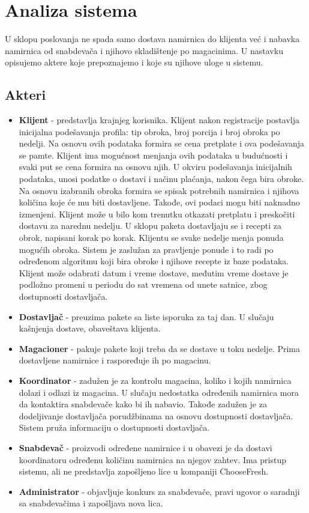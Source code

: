 \section{Analiza sistema}

	U sklopu poslovanja ne spada samo dostava namirnica do klijenta već i nabavka namirnica od snabdevača i njihovo skladištenje po magacinima. U nastavku opisujemo aktere koje prepoznajemo i koje su njihove uloge u sistemu.

\subsection{Akteri}
	\begin{itemize}
		\item{\textbf{Klijent}} - predstavlja krajnjeg korisnika. Klijent nakon registracije postavlja inicijalna podešavanja profila: tip obroka, broj porcija i broj obroka po nedelji. Na osnovu ovih podataka formira se cena pretplate i ova podešavanja se pamte. Klijent ima mogućnost menjanja ovih podataka u budućnosti i svaki put se cena formira na osnovu njih. U okviru podešavanja inicijalnih podataka, unosi podatke o dostavi i načinu plaćanja, nakon čega bira obroke. Na osnovu izabranih obroka formira se spisak potrebnih namirnica i njihova količina koje će mu biti dostavljene. Takođe, ovi podaci mogu biti naknadno izmenjeni. Klijent može u bilo kom trenutku otkazati pretplatu i preskočiti dostavu za narednu nedelju. U sklopu paketa dostavljaju se i recepti za obrok, napisani korak po korak. Klijentu se svake nedelje menja ponuda mogućih obroka. Sistem je zaslužan za pravljenje ponude i to radi po određenom algoritmu koji bira obroke i njihove recepte iz baze podataka. Klijent može odabrati datum i vreme dostave, međutim vreme dostave je podložno promeni u periodu do sat vremena od unete satnice, zbog dostupnosti dostavljača.
		\item{\textbf{Dostavljač}} - preuzima pakete sa liste isporuka za taj dan. U slučaju kašnjenja dostave, obaveštava klijenta.
		\item{\textbf{Magacioner}} - pakuje pakete koji treba da se dostave u toku nedelje. Prima dostavljene namirnice i raspoređuje ih po magacinu.
		\item{\textbf{Koordinator}} - zadužen je za kontrolu magacina, koliko i kojih namirnica dolazi i odlazi iz magacina. U slučaju nedostatka određenih namirnica mora da kontaktira snabdevače kako bi ih nabavio. Takođe zadužen je za dodeljivanje dostavljača porudžbinama na osnovu dostupnosti dostavljača. Sistem pruža informaciju o dostupnosti dostavljača.
		\item{\textbf{Snabdevač}} - proizvodi određene namirnice i u obavezi je da dostavi koordinatoru određenu količinu namirnica na njegov zahtev. Ima pristup sistemu, ali ne predstavlja zapošljeno lice u kompaniji ChooseFresh.
		\item{\textbf{Administrator}} - objavljuje konkurs za snabdevače, pravi ugovor o saradnji sa snabdevačima i zapošljava nova lica. 
		

\end{itemize}
